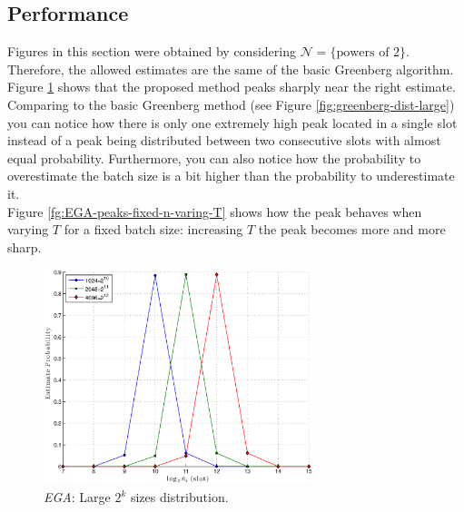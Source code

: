\documentclass[11pt,a4paper,twoside,openright]{book}
\begin{document}

\subsection{Performance}
Figures in this section were obtained by considering $\mathcal{N}=\{\textrm{powers of 2}\}$. Therefore, the allowed estimates are the same of the basic Greenberg algorithm.\\
Figure \ref{fg:EGA-sharp-peaks} shows that the proposed method peaks sharply near the right estimate. Comparing to the basic Greenberg method (see Figure \ref{fig:greenberg-dist-large}) you can notice how there is only one extremely high peak located in a single slot instead of a peak being distributed between two consecutive slots with almost equal probability. Furthermore, you can also notice how the probability to overestimate the batch size is a bit higher than the probability to underestimate it.\\
Figure \ref{fg:EGA-peaks-fixed-n-varing-T} shows how the peak behaves when varying $T$ for a fixed batch size: increasing $T$ the peak becomes more and more sharp.

\begin{figure}[H]
\begin{center}
\includegraphics[width=0.7\textwidth]{matlab/Greenberg_MLE/greenberg-mle-T20}
\caption{\emph{EGA}:  Large $2^{k}$ sizes distribution.}
\label{fg:EGA-sharp-peaks}
\end{center}
\end{figure}
\end{document}
